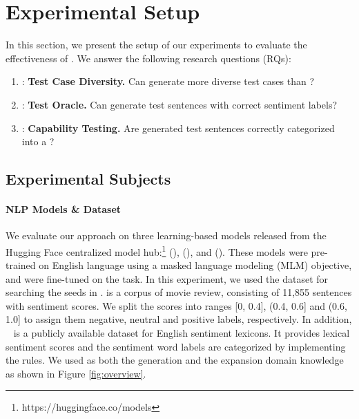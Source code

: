 \section{Experimental Setup}
\label{sec:experiment}
%
In this section, we present the setup of our experiments to evaluate
the effectiveness of \tool. We answer the following research
questions (RQs):

\begin{enumerate}[label=\textbf{RQ\arabic*}]
\item \label{rq:three}: \textbf{Test Case Diversity.} Can \tool generate more diverse test cases
  than \Cklst?
\item \label{rq:one}: \textbf{Test Oracle.}  Can \tool generate test sentences with correct sentiment labels?
\item \label{rq:two}: \textbf{Capability Testing.} Are \tool generated test sentences correctly categorized into a \lc?
\end{enumerate}


\subsection{Experimental Subjects}

\paragraph*{\textbf{NLP Models \& Dataset}}
We evaluate our approach on three learning-based \sa models released from the Hugging Face centralized
model hub:\footnote{https://huggingface.co/models} \texttt{\Bert}
(\bertsamodel), \texttt{\Roberta} (\robertasamodel), and \texttt{\Dbert} (\disbertsamodel). These models were pre-trained on English
language using a masked language modeling (MLM) objective, and
were fine-tuned on the \sa task. In this experiment, we used the \Sstt \cite{socher2013sst} dataset for
searching the seeds in \tool. \Sstt is a
corpus of movie review, consisting of 11,855 sentences
with sentiment scores. We split the
scores into ranges [0, 0.4], (0.4, 0.6] and (0.6, 1.0] to assign them
negative, neutral and positive labels, respectively. In addition,
\Swn~\cite{baccianella2010sentiwordnet} is a publicly available dataset for English sentiment lexicons.  
It provides lexical sentiment scores and the sentiment word labels 
are categorized by implementing the rules.
We used \Swn as both the generation and the expansion domain knowledge as shown in Figure \ref{fig:overview}.

